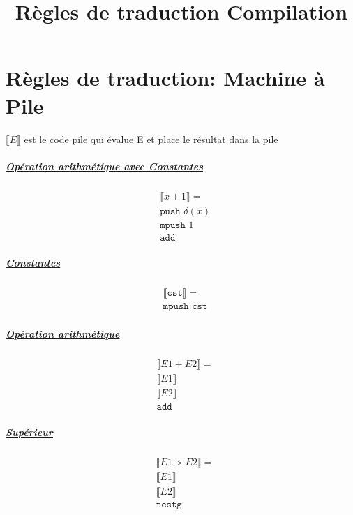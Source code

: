 \documentclass[12pt,twocolumn]{report}
\title{Règles de traduction Compilation}
\date{}
\begin{document}
\chapter*{Règles de traduction: Machine à Pile}

$\llbracket E \rrbracket$ est le code pile qui évalue E et place le résultat dans la pile

\begin{trad}
\paragraph*{ \underline{Opération arithmétique avec Constantes}}
\begin{align*}
    &\llbracket x +1 \rrbracket = \\
    &\texttt{push } \delta(x)\\
    &\texttt{mpush } 1\\
    &\texttt{add}
\end{align*}
\end{trad}
\begin{trad}
    \paragraph*{ \underline{Constantes}}
    \begin{align*}
        &\llbracket \texttt{cst} \rrbracket = \\
        &\texttt{mpush cst}
    \end{align*}
\end{trad}
\begin{trad}
    \paragraph*{ \underline{Opération arithmétique}}
    \begin{align*}
        &\llbracket E1+E2 \rrbracket = \\
        &\llbracket E1 \rrbracket\\
        &\llbracket E2 \rrbracket\\
        &\texttt{add}
    \end{align*}
\end{trad}
\begin{trad}
    \paragraph*{ \underline{Supérieur}}
    \begin{align*}
        &\llbracket E1>E2 \rrbracket = \\
        &\llbracket E1 \rrbracket\\
        &\llbracket E2 \rrbracket\\
        &\texttt{testg}
    \end{align*}
\end{trad}
\end{document}
